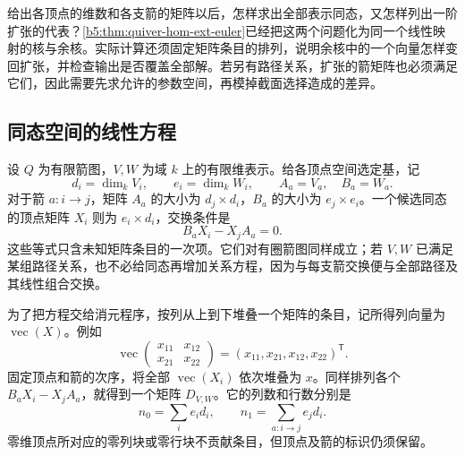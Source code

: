 

给出各顶点的维数和各支箭的矩阵以后，怎样求出全部表示同态，又怎样列出一阶扩张的代表？\cref{b5:thm:quiver-hom-ext-euler}已经把这两个问题化为同一个线性映射的核与余核。实际计算还须固定矩阵条目的排列，说明余核中的一个向量怎样变回扩张，并检查输出是否覆盖全部解。若另有路径关系，扩张的箭矩阵也必须满足它们，因此需要先求允许的参数空间，再模掉截面选择造成的差异。

\subsection{同态空间的线性方程}
\label{b5:subsec:0906:01}

设 \(Q\) 为有限箭图，\(V,W\) 为域 \(k\) 上的有限维表示。给各顶点空间选定基，记
\[
	d_i=\dim_kV_i,\qquad e_i=\dim_kW_i,
	\qquad A_a=V_a,\quad B_a=W_a.
\]
对于箭 \(a:i\to j\)，矩阵 \(A_a\) 的大小为 \(d_j\times d_i\)，\(B_a\) 的大小为 \(e_j\times e_i\)。一个候选同态的顶点矩阵 \(X_i\) 则为 \(e_i\times d_i\)，交换条件是
\[
	B_aX_i-X_jA_a=0.
\]
这些等式只含未知矩阵条目的一次项。它们对有圈箭图同样成立；若 \(V,W\) 已满足某组路径关系，也不必给同态再增加关系方程，因为与每支箭交换便与全部路径及其线性组合交换。

\ProseParagraphBreak
为了把方程交给消元程序，按列从上到下堆叠一个矩阵的条目，记所得列向量为 \(\operatorname{vec}(X)\)。例如
\[
	\operatorname{vec}\begin{pmatrix}x_{11}&x_{12}\\x_{21}&x_{22}\end{pmatrix}
	=(x_{11},x_{21},x_{12},x_{22})^{\mathsf T}.
\]
固定顶点和箭的次序，将全部 \(\operatorname{vec}(X_i)\) 依次堆叠为 \(x\)。同样排列各个 \(B_aX_i-X_jA_a\)，就得到一个矩阵 \(D_{V,W}\)。它的列数和行数分别是
\[
	n_0=\sum_i e_id_i,\qquad n_1=\sum_{a:i\to j}e_jd_i.
\]
零维顶点所对应的零列块或零行块不贡献条目，但顶点及箭的标识仍须保留。

